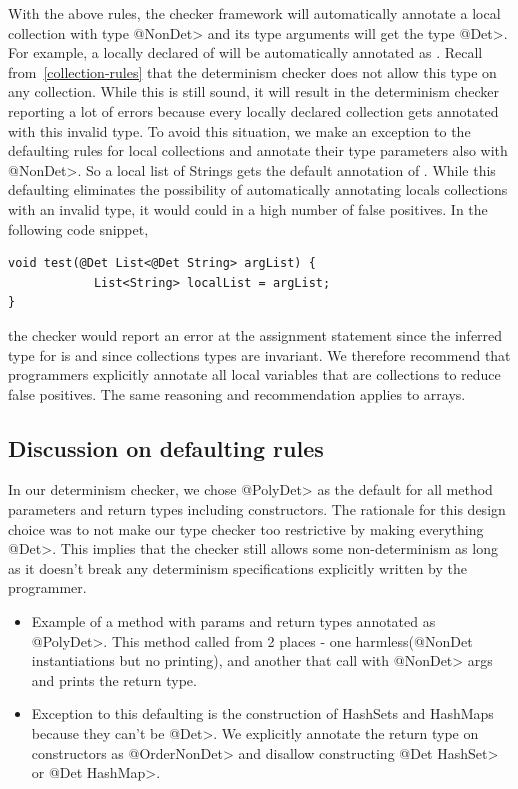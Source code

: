 With the above rules, the checker framework will automatically annotate a local collection with type \<@NonDet> and its
type arguments will get the type \<@Det>. For example, a locally declared  of  will be automatically annotated
as . Recall from~\ref{collection-rules} that the determinism checker does not allow this type on
any collection. While this is still sound, it will result in the determinism checker reporting a lot of errors because every locally declared 
collection gets annotated with this invalid type. To avoid this situation, we make an exception to the defaulting rules for local collections
and annotate their type parameters also with \<@NonDet>. So a local list of Strings gets the default annotation of . While this defaulting eliminates the possibility of automatically annotating locals collections with an invalid
type, it would could in a high number of false positives. In the following code snippet,
\begin{verbatim}
void test(@Det List<@Det String> argList) {
            List<String> localList = argList;
}    
\end{verbatim}
the checker would report an error at the assignment statement since the inferred type for  is 
 and since collections types are invariant.
We therefore recommend that programmers explicitly annotate
all local variables that are collections to reduce false positives. The same reasoning and recommendation applies to arrays.

\subsection{Discussion on defaulting rules}\label{defaulting}
In our determinism checker, we chose \<@PolyDet> as the default for all method parameters and return types including constructors.
The rationale for this design choice was to not make our type checker too restrictive by making everything \<@Det>.  This implies that
the checker still allows some non-determinism as long as it doesn't break any determinism specifications explicitly written by the programmer.

\begin{itemize}
    \item Example of a method with params and return types annotated as \<@PolyDet>.
    This method called from 2 places - one harmless(@NonDet instantiations but no printing), and another that call with \<@NonDet> args and prints the return type.
    \item Exception to this defaulting is the construction of HashSets and HashMaps because they can't be \<@Det>.
    We explicitly annotate the return type on constructors as
        \<@OrderNonDet> and disallow constructing \<@Det HashSet> or \<@Det
        HashMap>.
\end{itemize}

